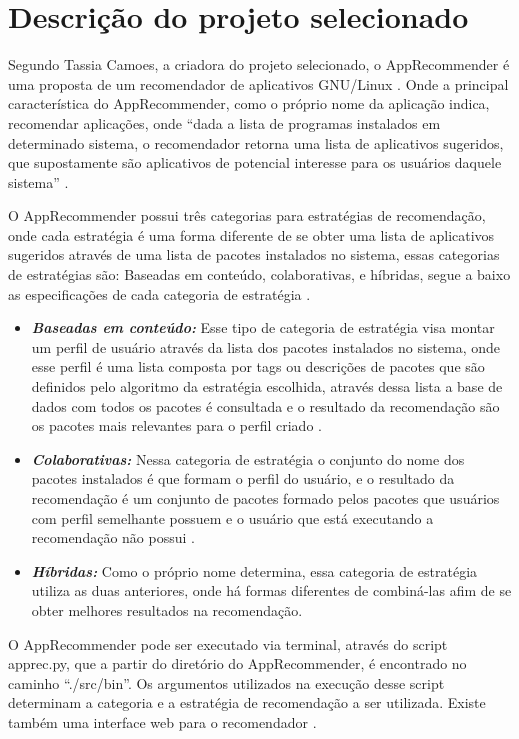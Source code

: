 \section{Descrição do projeto selecionado}

Segundo Tassia Camoes, a criadora do projeto selecionado, o AppRecommender é uma
proposta de um recomendador de aplicativos GNU/Linux \cite{araujo2011apprecommender}.
Onde a principal característica do AppRecommender, como o próprio nome da aplicação
indica, recomendar aplicações, onde “dada a lista de programas instalados em
determinado sistema, o recomendador retorna uma lista de aplicativos sugeridos, que
supostamente são aplicativos de potencial interesse para os usuários daquele sistema”
\cite{araujo2011apprecommender}.

O AppRecommender possui três categorias para estratégias de recomendação, onde cada
estratégia é uma forma diferente de se obter uma lista de aplicativos sugeridos
através de uma lista de pacotes instalados no sistema, essas categorias de estratégias
são: Baseadas em conteúdo, colaborativas, e híbridas, segue a baixo as especificações
de cada categoria de estratégia \cite{araujo2011apprecommender}.

\begin{itemize}
    \item \textit{\textbf{Baseadas em conteúdo:}} Esse tipo de categoria de estratégia
visa montar um perfil de usuário através da lista dos pacotes instalados no sistema,
onde esse perfil é uma lista composta por tags ou descrições de pacotes que são
definidos pelo algoritmo da estratégia escolhida, através dessa lista a base de dados
com todos os pacotes é consultada e o resultado da recomendação são os pacotes mais
relevantes para o perfil criado \cite{araujo2011apprecommender}.
    \item \textit{\textbf{Colaborativas:}} Nessa categoria de estratégia o conjunto
do nome dos pacotes instalados é que formam o perfil do usuário, e o resultado da
recomendação é um conjunto de pacotes formado pelos pacotes que usuários com perfil
semelhante possuem e o usuário que está executando a recomendação não possui \cite{araujo2011apprecommender}.
    \item \textit{\textbf{Híbridas:}} Como o próprio nome determina, essa categoria
de estratégia utiliza as duas anteriores, onde há formas diferentes de combiná-las
afim de se obter melhores resultados na recomendação.
\end{itemize}

O AppRecommender pode ser executado via terminal, através do script apprec.py, que a
partir do diretório do AppRecommender, é encontrado no caminho “./src/bin”. Os
argumentos utilizados na execução desse script determinam a categoria e a estratégia
de recomendação a ser utilizada. Existe também uma interface web para o recomendador
\cite{araujo2011apprecommender}.

